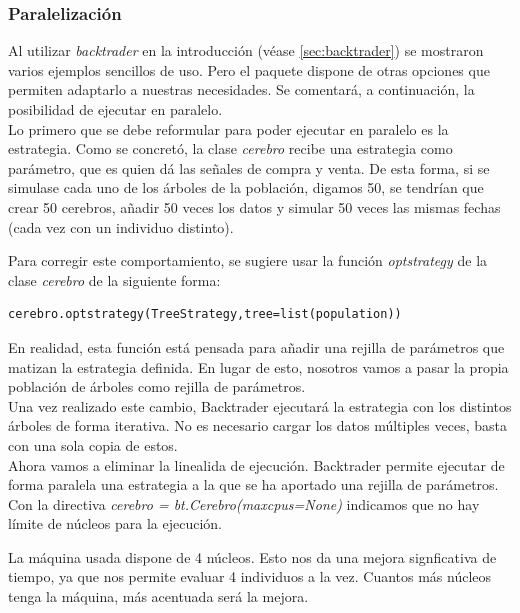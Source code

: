 \subsubsection{Paralelizaci\'on}
Al utilizar \textit{backtrader} en la introducci\'on (v\'ease \ref{sec:backtrader}) se mostraron varios ejemplos sencillos de uso. Pero el paquete dispone de otras opciones que permiten adaptarlo a nuestras necesidades. Se comentar\'a, a continuaci\'on, la posibilidad de ejecutar en paralelo.\\

Lo primero que se debe reformular para poder ejecutar en paralelo es la estrategia. Como se concret\'o, la clase \textit{cerebro} recibe una estrategia como par\'ametro, que es quien d\'a las se\~nales de compra y venta. De esta forma, si se simulase cada uno de los \'arboles de la poblaci\'on, digamos 50, se tendr\'ian que crear 50 cerebros, a\~nadir 50 veces los datos y simular 50 veces las mismas fechas (cada vez con un individuo distinto).

Para corregir este comportamiento, se sugiere usar la funci\'on \textit{optstrategy} de la clase \textit{cerebro} de la siguiente forma:

\begin{lstlisting}
cerebro.optstrategy(TreeStrategy,tree=list(population))
\end{lstlisting}

En realidad, esta funci\'on est\'a pensada para a\~nadir una rejilla de par\'ametros que matizan la estrategia definida. En lugar de esto, nosotros vamos a pasar la propia poblaci\'on de \'arboles como rejilla de par\'ametros.\\

Una vez realizado este cambio, Backtrader ejecutar\'a la estrategia con los distintos \'arboles de forma iterativa. No es necesario cargar los datos m\'ultiples veces, basta con una sola copia de estos.\\

Ahora vamos a eliminar la linealida de ejecuci\'on. Backtrader permite ejecutar de forma paralela una estrategia a la que se ha aportado una rejilla de par\'ametros. Con la directiva \textit{cerebro = bt.Cerebro(maxcpus=None)} indicamos que no hay l\'imite de n\'ucleos para la ejecuci\'on. 

La m\'aquina usada dispone de 4 n\'ucleos. Esto nos da una mejora signficativa de tiempo, ya que nos permite evaluar 4 individuos a la vez. Cuantos m\'as n\'ucleos tenga la m\'aquina, m\'as acentuada ser\'a la mejora.


